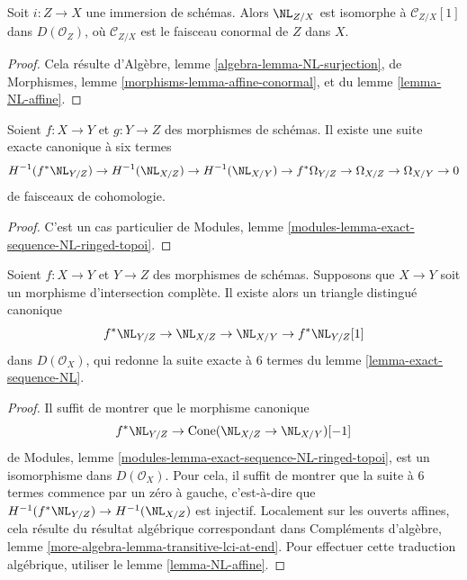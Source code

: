 \begin{lemma}
\label{lemma-NL-immersion}
Soit $i : Z \to X$ une immersion de schémas. Alors $\NL_{Z/X}$
est isomorphe à $\mathcal{C}_{Z/X}[1]$ dans $D(\mathcal{O}_Z)$,
où $\mathcal{C}_{Z/X}$ est le faisceau conormal de $Z$ dans $X$.
\end{lemma}

\begin{proof}
Cela résulte d'Algèbre, lemme \ref{algebra-lemma-NL-surjection},
de Morphismes, lemme \ref{morphisms-lemma-affine-conormal}, et
du lemme \ref{lemma-NL-affine}.
\end{proof}

\begin{lemma}
\label{lemma-exact-sequence-NL}
Soient $f : X \to Y$ et $g : Y \to Z$ des morphismes de schémas.
Il existe une suite exacte canonique à six termes
$$
H^{-1}(f^*\NL_{Y/Z}) \to
H^{-1}(\NL_{X/Z}) \to
H^{-1}(\NL_{X/Y}) \to
f^*\Omega_{Y/Z} \to \Omega_{X/Z} \to \Omega_{X/Y} \to 0
$$
de faisceaux de cohomologie.
\end{lemma}

\begin{proof}
C'est un cas particulier de
Modules, lemme \ref{modules-lemma-exact-sequence-NL-ringed-topoi}.
\end{proof}

\begin{lemma}
\label{lemma-get-triangle-NL}
Soient $f : X \to Y$ et $Y \to Z$ des morphismes de schémas. Supposons que
$X \to Y$ soit un morphisme d'intersection complète. Il existe alors
un triangle distingué canonique
$$
f^*\NL_{Y/Z} \to \NL_{X/Z} \to \NL_{X/Y} \to f^*\NL_{Y/Z}[1]
$$
dans $D(\mathcal{O}_X)$, qui redonne la suite exacte à $6$ termes du
lemme \ref{lemma-exact-sequence-NL}.
\end{lemma}

\begin{proof}
Il suffit de montrer que le morphisme canonique
$$
f^*\NL_{Y/Z} \to \text{Cone}(\NL_{X/Z} \to \NL_{X/Y})[-1]
$$
de Modules, lemme \ref{modules-lemma-exact-sequence-NL-ringed-topoi},
est un isomorphisme dans $D(\mathcal{O}_X)$. Pour cela,
il suffit de montrer que la suite à $6$ termes commence par
un zéro à gauche, c'est-à-dire que $H^{-1}(f^*\NL_{Y/Z}) \to H^{-1}(\NL_{X/Z})$
est injectif. Localement sur les ouverts affines, cela résulte du
résultat algébrique correspondant dans Compléments d'algèbre, lemme
\ref{more-algebra-lemma-transitive-lci-at-end}.
Pour effectuer cette traduction algébrique, utiliser le lemme \ref{lemma-NL-affine}.
\end{proof}

